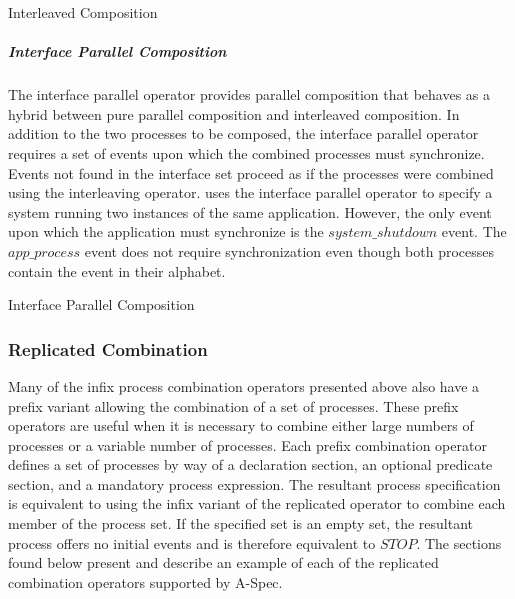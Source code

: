 \documentclass[letterpaper,10pt,draft]{book}
\begin{document}
\begin{example}
\begin{minipage}[t]{0.49\linewidth}
   
\end{minipage}
\begin{minipage}[t]{0.49\linewidth}
   \azbox
   
\end{minipage}

   \caption{Interleaved Composition}
   \label{ex:Interleave}
\end{example}

\subparagraph{Interface Parallel Composition}
   \label{sect:IFPar}

The interface parallel operator provides parallel composition that behaves as a
hybrid between pure parallel composition and interleaved composition.  In addition
to the two processes to be composed, the interface parallel operator requires a
set of events upon which the combined processes must synchronize.  Events not found
in the interface set proceed as if the processes were combined using the interleaving
operator.   uses the interface parallel operator to specify a system
running two instances of the same application.  However, the only event upon which
the application must synchronize is the $system\_shutdown$ event.  The $app\_process$
event does not require synchronization even though both processes contain the event
in their alphabet.

\begin{example}
\begin{minipage}[t]{0.50\linewidth}
   
\end{minipage}
\begin{minipage}[t]{0.49\linewidth}
   \azbox
   
\end{minipage}

   \caption{Interface Parallel Composition}
   \label{ex:IFPar}
\end{example}

\subsubsection{Replicated Combination}
   \label{sect:ProcRepl}

Many of the infix process combination operators presented above also have a prefix
variant allowing the combination of a set of processes.  These prefix operators
are useful when it is necessary to combine either large numbers of processes or
a variable number of processes.  Each prefix combination operator defines a set
of processes by way of a declaration section, an optional predicate section, and
a mandatory process expression.  The resultant process specification is equivalent
to using the infix variant of the replicated operator to combine each member of
the process set.  If the specified set is an empty set, the resultant process offers
no initial events and is therefore equivalent to $STOP$.  The sections found below
present and describe an example of each of the replicated combination operators
supported by A-Spec.
\end{document}

